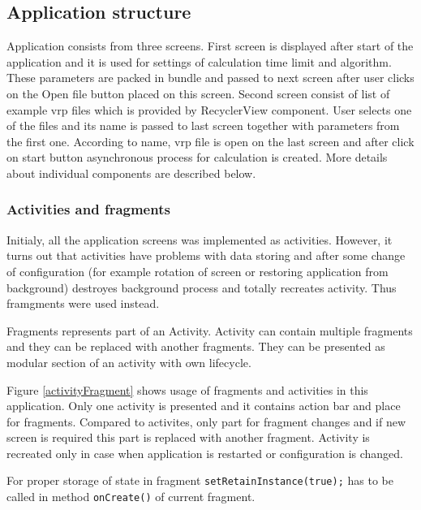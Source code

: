 \subsection{Application structure} %
Application consists from three screens. First screen is displayed after start of the application and it is used for
settings of calculation time limit and algorithm. These parameters are packed in bundle and passed to next screen after
user clicks on the Open file button placed on this screen. Second screen consist of list of example vrp files which is
provided by RecyclerView component. User selects one of the files and its name is passed to last screen together with
parameters from the first one. According to name, vrp file is open on the last screen and after click on start button
asynchronous process for calculation is created. More details about individual components are described below.

\subsubsection{Activities and fragments}
Initialy, all the application screens was implemented as activities. However, it turns out that activities have problems
with data storing and after some change of configuration (for example rotation of screen or restoring application from
background) destroyes background process and totally recreates activity. Thus framgments were used instead.

Fragments represents part of an Activity. Activity can contain multiple fragments and they can be replaced with another
fragments. They can be presented as modular section of an activity with own lifecycle.

Figure \ref{activityFragment} shows usage of fragments and activities in this application. Only one activity is presented and it
contains action bar and place for fragments. Compared to activites, only part for fragment changes and if new screen is
required this part is replaced with another fragment. Activity is recreated only in case when application is restarted
or configuration is changed.

For proper storage of state in fragment \texttt{setRetainInstance(true);} has to be called in method \texttt{onCreate()}
of current fragment.

